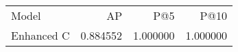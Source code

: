 \begin{tabular}{lrrr}
Model & AP & P@5 & P@10 \\
Enhanced C & 0.884552 & 1.000000 & 1.000000 \\
\end{tabular}
